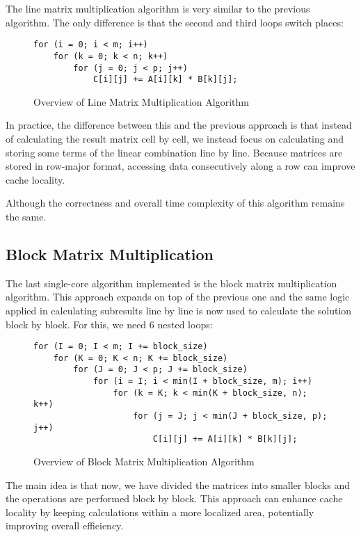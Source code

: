 The line matrix multiplication algorithm is very similar to the previous algorithm. The only difference is that the second and third loops switch places:

\begin{figure}[ht!]
\begin{verbatim}
for (i = 0; i < m; i++)
    for (k = 0; k < n; k++)
        for (j = 0; j < p; j++)
            C[i][j] += A[i][k] * B[k][j];
\end{verbatim}
\caption{Overview of Line Matrix Multiplication Algorithm}
\label{fig:algo:line}
\end{figure}

In practice, the difference between this and the previous approach is that instead of calculating the result matrix cell by cell, we instead focus on calculating and storing some terms of the linear combination line by line. Because matrices are stored in row-major format, accessing data consecutively along a row can improve cache locality.

Although the correctness and overall time complexity of this algorithm remains the same.

\subsection{Block Matrix Multiplication}

The last single-core algorithm implemented is the block matrix multiplication algorithm. This approach expands on top of the previous one and the same logic applied in calculating subresults line by line is now used to calculate the solution block by block. For this, we need 6 nested loops:

\begin{figure}[ht!]
\begin{verbatim}
for (I = 0; I < m; I += block_size)
    for (K = 0; K < n; K += block_size)
        for (J = 0; J < p; J += block_size)
            for (i = I; i < min(I + block_size, m); i++)
                for (k = K; k < min(K + block_size, n); k++)
                    for (j = J; j < min(J + block_size, p); j++)
                        C[i][j] += A[i][k] * B[k][j];
\end{verbatim}
\caption{Overview of Block Matrix Multiplication Algorithm}
\label{fig:algo:block}
\end{figure}

The main idea is that now, we have divided the matrices into smaller blocks and the operations are performed block by block. This approach can enhance cache locality by keeping calculations within a more localized area, potentially improving overall efficiency.

